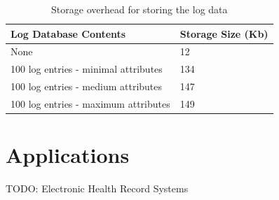 \documentclass{sig-alternate}
\begin{document}
\begin{table}
\label{tab:storage}
\caption{Storage overhead for storing the log data}
  \begin{tabular}{|l|l|}
    \hline
    Log Database Contents & Storage Size (Kb) \\ \hline
    None & 12 \\ 
    100 log entries - minimal attributes & 134 \\ 
    100 log entries - medium attributes & 147 \\ 
    100 log entries - maximum attributes & 149 \\
    \hline
  \end{tabular}
\end{table}

\section{Applications}
TODO: Electronic Health Record Systems

\balance
\end{document}

